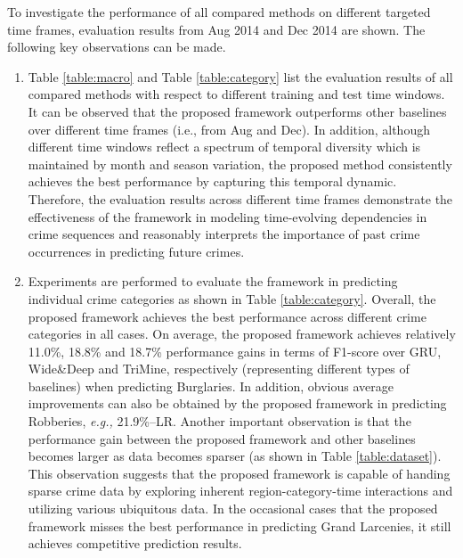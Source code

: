 To investigate the performance of all compared methods on different
targeted time frames, evaluation results from Aug 2014
and Dec 2014 are shown. The following key observations can be made.
\begin{enumerate}
    \item Table \ref{table:macro} and Table \ref{table:category} list the evaluation results of all compared
    methods with respect to different training and test time windows.
    It can be observed that the proposed framework outperforms other baselines over different time frames (i.e., from Aug and Dec).
    In addition, although different time windows reflect a
    spectrum of temporal diversity which is maintained by month and
    season variation, the proposed method consistently achieves the best
    performance by capturing this temporal dynamic. Therefore, the
    evaluation results across different time frames demonstrate the effectiveness of the framework in modeling time-evolving dependencies
    in crime sequences and reasonably interprets the importance of
    past crime occurrences in predicting future crimes.

    \item Experiments are performed to evaluate the framework in predicting 
    individual crime categories as shown in Table \ref{table:category}. Overall, the proposed
    framework achieves the best performance across different crime
    categories in all cases. On average, the proposed framework achieves relatively
    11.0\%, 18.8\% and 18.7\% performance gains in terms of F1-score over
    GRU, Wide\&Deep and TriMine, respectively (representing different
    types of baselines) when predicting Burglaries. In addition, obvious
    average improvements can also be obtained by the proposed framework in predicting Robberies, 
    \emph{e.g.,} 21.9\%–LR. Another important observation is
    that the performance gain between the proposed framework and other baselines
    becomes larger as data becomes sparser (as shown in Table \ref{table:dataset}). This
    observation suggests that the proposed framework is capable of handing sparse
    crime data by exploring inherent region-category-time interactions
    and utilizing various ubiquitous data. In the occasional cases that
    the proposed framework misses the best performance in predicting Grand Larcenies, 
    it still achieves competitive prediction results.
    

\end{enumerate}
